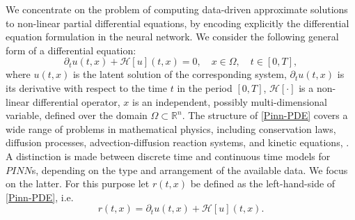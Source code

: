 We concentrate on the problem of computing data-driven approximate solutions to non-linear partial differential equations, by encoding explicitly the differential equation formulation in the neural network. We consider the following general form of a differential equation:
\begin{equation}
    \label{Pinn-PDE}
    \partial_t u\left(t,x\right) + \mathcal{H} \left[ u \right] \left(t, x\right) = 0, \quad x \in \Omega, \quad t \in \left[ 0, T \right], 
\end{equation}
where $u\left(t,x\right)$ is the latent solution of the corresponding system, $\partial_t u\left(t,x\right)$ is its derivative with respect to the time $t$ in the period $\left[ 0, T \right]$, $\mathcal{H} \left[ \cdot \right]$ is a non-linear differential operator, $x$ is an independent, possibly multi-dimensional variable, defined over the domain $\Omega \subset \mathbb{R}^{n}$. The structure of \cref{Pinn-PDE} covers a wide range of problems in mathematical physics, including conservation laws, diffusion processes, advection-diffusion reaction systems, and kinetic equations, \cite[p.~3]{RaissiPerdikarisKarniadakisPart1:2017}. \\
A distinction is made between discrete time and continuous time models for $PINN$s, depending on the type and arrangement of the available data. We focus on the latter. For this purpose let $r\left(t,x\right)$ be defined as the left-hand-side of \cref{Pinn-PDE}, i.e.
\begin{equation}
    \label{Residual Network}
    r\left(t,x\right) = \partial_t u\left(t,x\right) + \mathcal{H} \left[ u \right] \left(t, x\right).
\end{equation}
